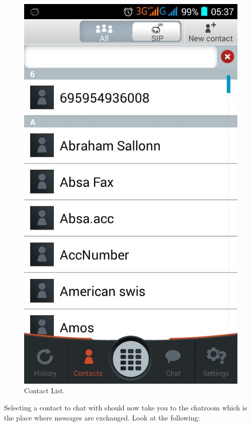 \documentclass[a4paper]{article}
\begin{document}
\begin{center}
\begin{figure}[H]
\centering
\includegraphics[width=0.7\linewidth]{pictures/Screenshot_2015-08-04-05-37-18.png}
\caption{\label{fig:Screen4}Contact List.}
\end{figure}
\end{center}

Selecting a contact to chat with should now take you to the chatroom which is the place where messages are exchanged. Look at the following:
\end{document}
